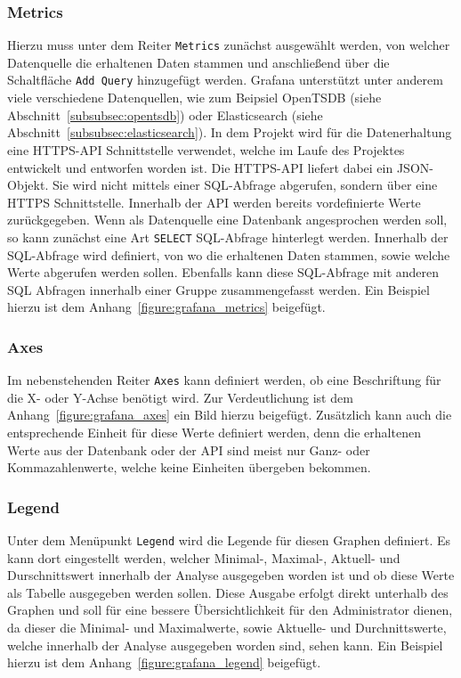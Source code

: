 \subsubsection{Metrics}
Hierzu muss unter dem Reiter \texttt{Metrics} zunächst ausgewählt werden, von
welcher Datenquelle die erhaltenen Daten stammen und anschließend über die
Schaltfläche \texttt{Add Query} hinzugefügt werden. Grafana unterstützt unter
anderem viele verschiedene Datenquellen, wie zum Beipsiel OpenTSDB (siehe
Abschnitt~\ref{subsubsec:opentsdb}) oder Elasticsearch (siehe
Abschnitt~\ref{subsubsec:elasticsearch}). In dem Projekt wird für die
Datenerhaltung eine \gls{HTTPS}\hyp{}\gls{API} Schnittstelle verwendet, welche
im Laufe des Projektes entwickelt und entworfen worden ist. Die
\gls{HTTPS}\hyp{}\gls{API} liefert dabei ein \gls{JSON}\hyp{}Objekt. Sie wird
nicht mittels einer \gls{SQL}\hyp{}Abfrage abgerufen, sondern über eine
\gls{HTTPS} Schnittstelle. Innerhalb der \gls{API} werden bereits vordefinierte
Werte zurückgegeben. Wenn als Datenquelle eine Datenbank angesprochen werden
soll, so kann zunächst eine Art \texttt{SELECT} \gls{SQL}\hyp{}Abfrage
hinterlegt werden. Innerhalb der \gls{SQL}\hyp{}Abfrage wird definiert, von wo
die erhaltenen Daten stammen, sowie welche Werte abgerufen werden sollen.
Ebenfalls kann diese \gls{SQL}\hyp{}Abfrage mit anderen \gls{SQL} Abfragen
innerhalb einer Gruppe zusammengefasst werden. Ein Beispiel hierzu ist dem
Anhang~\ref{figure:grafana_metrics} beigefügt.
\mr%

\subsubsection{Axes}
Im nebenstehenden Reiter \texttt{Axes} kann definiert werden, ob eine
Beschriftung für die X\hyp{} oder Y\hyp{}Achse benötigt wird. Zur
Verdeutlichung ist dem Anhang~\ref{figure:grafana_axes} ein Bild hierzu
beigefügt. Zusätzlich kann auch die entsprechende Einheit für diese Werte
definiert werden, denn die erhaltenen Werte aus der Datenbank oder der
\gls{API} sind meist nur Ganz\hyp{} oder Kommazahlenwerte, welche keine
Einheiten übergeben bekommen.
\mr%

\subsubsection{Legend}
Unter dem Menüpunkt \texttt{Legend} wird die Legende für diesen Graphen
definiert. Es kann dort eingestellt werden, welcher Minimal\hyp{},
Maximal\hyp{}, Aktuell\hyp{} und Durschnittswert innerhalb der Analyse
ausgegeben worden ist und ob diese Werte als Tabelle ausgegeben werden sollen.
Diese Ausgabe erfolgt direkt unterhalb des Graphen und soll für eine bessere
Übersichtlichkeit für den Administrator dienen, da dieser die Minimal\hyp{} und
Maximalwerte, sowie Aktuelle\hyp{} und Durchnittswerte, welche innerhalb der
Analyse ausgegeben worden sind, sehen kann. Ein Beispiel hierzu ist dem
Anhang~\ref{figure:grafana_legend} beigefügt.
\mr%


